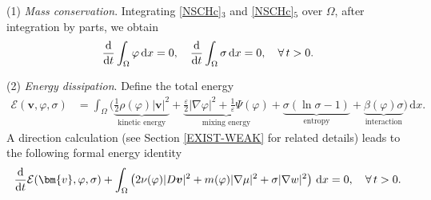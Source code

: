 \documentclass[11pt,reqno]{amsart}
\def\d{{\rm d}}
\begin{document}
(1) \emph{Mass conservation}. Integrating \eqref{NSCHc}$_3$ and %
\eqref{NSCHc}$_5$ over $\Omega$, after integration by parts, we obtain
%
\begin{align}
\frac{\d}{\d t} \int_\Omega \varphi\,\d x =0,\quad \frac{\d}{\d t} \int_\Omega \sigma\,\d x =0,\quad \forall\, t>0.
\end{align}

(2) \emph{Energy dissipation}. Define the total energy
%
\begin{align}
\mathcal{E}(\bm{v},\varphi,\sigma)
&=\int_{\Omega}\Big( \underbrace{\frac{1}{2}\rho(\varphi)|\boldsymbol{v}|^{2}}_{\text{kinetic energy}}
+ \underbrace{\frac{\varepsilon}{2}|\nabla \varphi|^{2}
+ \frac{1}{\varepsilon}\Psi(\varphi)}_{\text{mixing energy}}
+ \underbrace{\sigma(\ln \sigma-1)}_{\text{entropy}}
+ \underbrace{\beta(\varphi) \sigma}_{\text{interaction}}\Big)\, \mathrm{d} x.
\label{total-Energy-0}
\end{align}
%
A direction calculation (see Section \ref{EXIST-WEAK} for related details) leads to the following formal energy identity
%
\begin{align}
\frac{\d}{\d t}\mathcal{E}(\bm{v},\varphi,\sigma)
+
\int_{\Omega} \left(2 \nu(\varphi)|D \boldsymbol{v}|^{2}
+m(\varphi)|\nabla \mu|^{2} +  \sigma|\nabla w|^2 \right)\, \mathrm{d} x=0,\quad \forall\, t>0.
\label{energy-id-0}
\end{align}
\end{document}

